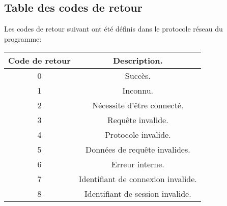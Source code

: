 \subsection{Table des codes de retour}
Les codes de retour suivant ont été définis dans le protocole réseau du programme:
\begin{center}
	\begin{tabular}{|c|c|}
		\hline
		Code de retour & Description.\\
		\hline
		0	&	Succès.\\
		\hline
		1	&	Inconnu.\\
		\hline
		2	&	Nécessite d'être connecté.\\
		\hline
		3	&	Requête	invalide.\\
		\hline
		4	&	Protocole invalide.\\
		\hline
		5	&	Données	de requête invalides.\\
		\hline
		6	&	Erreur interne.\\
		\hline
		7	&	Identifiant de connexion invalide.\\
		\hline
		8	&	Identifiant de session invalide.\\
		\hline
	\end{tabular}
\end{center}

% 
